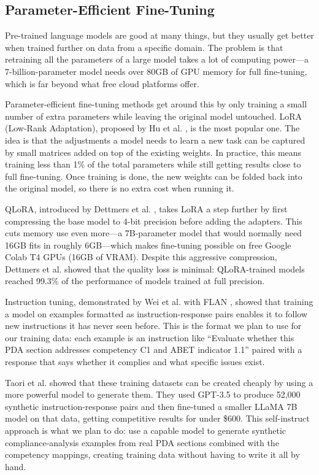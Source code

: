 \documentclass[conference]{IEEEtran}
\begin{document}
\subsection{Parameter-Efficient Fine-Tuning}

Pre-trained language models are good at many things, but they usually get better when trained further on data from a specific domain. The problem is that retraining all the parameters of a large model takes a lot of computing power---a 7-billion-parameter model needs over 80GB of GPU memory for full fine-tuning, which is far beyond what free cloud platforms offer.

Parameter-efficient fine-tuning methods get around this by only training a small number of extra parameters while leaving the original model untouched. LoRA (Low-Rank Adaptation), proposed by Hu et al. \cite{hu2022lora}, is the most popular one. The idea is that the adjustments a model needs to learn a new task can be captured by small matrices added on top of the existing weights. In practice, this means training less than 1\% of the total parameters while still getting results close to full fine-tuning. Once training is done, the new weights can be folded back into the original model, so there is no extra cost when running it.

QLoRA, introduced by Dettmers et al. \cite{dettmers2023qlora}, takes LoRA a step further by first compressing the base model to 4-bit precision before adding the adapters. This cuts memory use even more---a 7B-parameter model that would normally need 16GB fits in roughly 6GB---which makes fine-tuning possible on free Google Colab T4 GPUs (16GB of VRAM). Despite this aggressive compression, Dettmers et al. showed that the quality loss is minimal: QLoRA-trained models reached 99.3\% of the performance of models trained at full precision.

Instruction tuning, demonstrated by Wei et al. with FLAN \cite{wei2022flan}, showed that training a model on examples formatted as instruction-response pairs enables it to follow new instructions it has never seen before. This is the format we plan to use for our training data: each example is an instruction like ``Evaluate whether this PDA section addresses competency C1 and ABET indicator 1.1'' paired with a response that says whether it complies and what specific issues exist.

Taori et al. \cite{taori2023alpaca} showed that these training datasets can be created cheaply by using a more powerful model to generate them. They used GPT-3.5 to produce 52,000 synthetic instruction-response pairs and then fine-tuned a smaller LLaMA 7B model on that data, getting competitive results for under \$600. This self-instruct approach \cite{wang2022selfinstruct} is what we plan to do: use a capable model to generate synthetic compliance-analysis examples from real PDA sections combined with the competency mappings, creating training data without having to write it all by hand.
\end{document}
